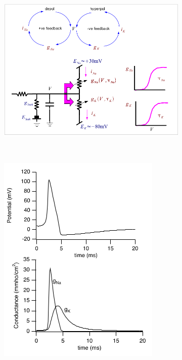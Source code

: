\documentclass[english,11pt]{article}
\begin{document}
\begin{figure}[H]
        \centering
        \begin{subfigure}[b]{0.6\textwidth}
                \centering
\includegraphics[width=\textwidth]{pos-neg-feedback-loops.png}
        \end{subfigure}%
        ~
        \begin{subfigure}[b]{0.4\textwidth}
                \centering
\includegraphics[width=\textwidth]{action-potential.png}
        \end{subfigure}
\end{figure}
\end{document}
